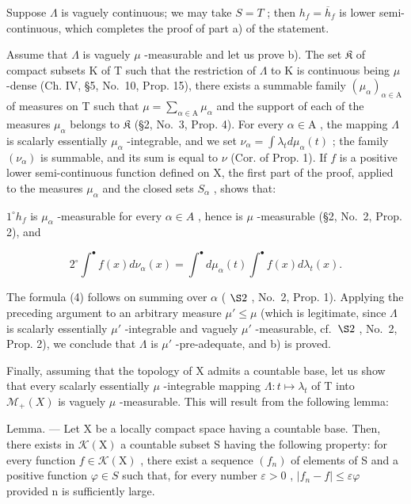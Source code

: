 Suppose \(\Lambda\) is vaguely continuous; we may take \(S = T\) ; then \(h_f = \overline{h}_f\) is lower semi-continuous, which completes the proof of part a) of the statement.

Assume that \(\Lambda\) is vaguely \(\mu\) -measurable and let us prove b). The set \(\mathfrak{K}\) of compact subsets K of T such that the restriction of \(\Lambda\) to K is continuous being \(\mu\) -dense (Ch. IV, §5, No.~10, Prop. 15), there exists a summable family \((\mu_{\alpha})_{\alpha \in \mathrm{A}}\) of measures on T such that \(\mu = \sum_{\alpha \in \mathrm{A}} \mu_{\alpha}\) and the support of each of the measures \(\mu_{\alpha}\) belongs to \(\mathfrak{K}\) (§2, No.~3, Prop. 4). For every \(\alpha \in \mathrm{A}\) , the mapping \(\Lambda\) is scalarly essentially \(\mu_{\alpha}\) -integrable, and we set \(\nu_{\alpha} = \int \lambda_t d\mu_{\alpha}(t)\) ; the family \((\nu_{\alpha})\) is summable, and its sum is equal to \(\nu\) (Cor. of Prop. 1). If \(f\) is a positive lower semi-continuous function defined on X, the first part of the proof, applied to the measures \(\mu_{\alpha}\) and the closed sets \(S_{\alpha}\) , shows that:

\(1^{\circ} h_{f}\) is \(\mu_{\alpha}\) -measurable for every \(\alpha \in A\) , hence is \(\mu\) -measurable (§2, No.~2, Prop. 2), and

\[
2 ^ {\circ} \int^ {\bullet} f (x) d \nu_ {\alpha} (x) = \int^ {\bullet} d \mu_ {\alpha} (t) \int^ {\bullet} f (x) d \lambda_ {t} (x).
\]

The formula (4) follows on summing over \(\alpha\) ( \(\S 2\) , No.~2, Prop. 1). Applying the preceding argument to an arbitrary measure \(\mu' \leqslant \mu\) (which is legitimate, since \(\Lambda\) is scalarly essentially \(\mu'\) -integrable and vaguely \(\mu'\) -measurable, cf.~\(\S 2\) , No.~2, Prop. 2), we conclude that \(\Lambda\) is \(\mu'\) -pre-adequate, and b) is proved.

Finally, assuming that the topology of X admits a countable base, let us show that every scalarly essentially \(\mu\) -integrable mapping \(\Lambda: t \mapsto \lambda_{t}\) of T into \(\mathcal{M}_{+}(X)\) is vaguely \(\mu\) -measurable. This will result from the following lemma:

Lemma. --- Let X be a locally compact space having a countable base. Then, there exists in \(\mathcal{K}(\mathrm{X})\) a countable subset S having the following property: for every function \(f \in \mathcal{K}(\mathrm{X})\) , there exist a sequence \((f_n)\) of elements of S and a positive function \(\varphi \in S\) such that, for every number \(\varepsilon > 0\) , \(|f_n - f| \leqslant \varepsilon \varphi\) provided n is sufficiently large.

